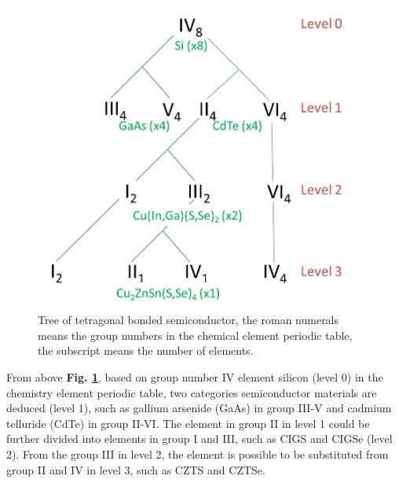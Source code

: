 \documentclass[a4paper, 12pt, titlepage,oneside,drop]{kthesis}
\begin{document}
\begin{figure}[H]
\centering
\includegraphics[scale=0.5]{tree.jpg} 
\caption{Tree of tetragonal bonded semiconductor, the roman numerals means the group numbers in the chemical element periodic table, the subscript means the number of elements.}
\label{lscm}
\end{figure}

From above \textbf{Fig. \ref{lscm}}, based on group number IV element silicon (level 0) in the chemistry element periodic table, two categories semiconductor materials are deduced (level 1), such as gallium arsenide (GaAs) in group III-V and cadmium telluride (CdTe)
in group II-VI. The element in group II in level 1 could be further divided into elements in group I and III, such as CIGS and CIGSe (level 2). From the group III in level 2, the element is possible to
be substituted from group II and IV in level 3, such as CZTS and CZTSe.
\end{document}
